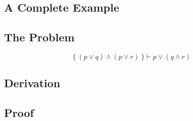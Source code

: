 \documentclass[../main.tex]{subfiles}
\begin{document}
\begin{subappendices}

\renewcommand{\thesection}{\Alph{section}}%

\section{A Complete Example}
\label{appendix}

\subsection{The Problem}

\begin{equation*}
\{\ (p ∨ q) ∧ (p ∨ r)\ \} \vdash p ∨ (q ∧ r)
\end{equation*}

\subsection{\TSTP Derivation}


\subsection{\Agda Proof}

\end{subappendices}
\end{document}
